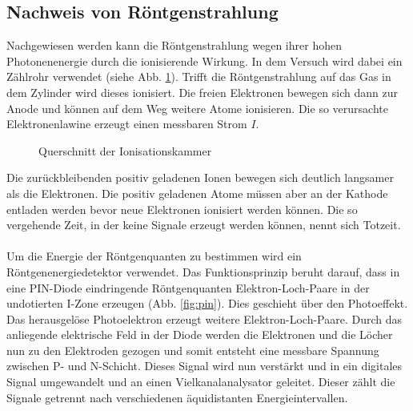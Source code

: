 \subsection{Nachweis von Röntgenstrahlung}

Nachgewiesen werden kann die Röntgenstrahlung wegen ihrer hohen Photonenenergie durch die ionisierende Wirkung. In dem Versuch wird dabei ein Zählrohr \cite{grundlagen} verwendet (siehe Abb. \ref{fig:rohr}). Trifft die Röntgenstrahlung auf das Gas in dem Zylinder wird dieses ionisiert. Die freien Elektronen bewegen sich dann zur Anode und können auf dem Weg weitere Atome ionisieren. Die so verursachte Elektronenlawine erzeugt einen messbaren Strom $I$. 

\begin{figure}[h]
  \centering
  \caption{Querschnitt der Ionisationskammer}
  \label{fig:rohr}
\end{figure}
Die zurückbleibenden positiv geladenen Ionen bewegen sich deutlich langsamer als die Elektronen. Die positiv geladenen Atome müssen aber an der Kathode entladen werden bevor neue Elektronen ionisiert werden können. Die so vergehende Zeit, in der keine Signale erzeugt werden können, nennt sich Totzeit. \\ \\
Um die Energie der Röntgenquanten zu bestimmen wird ein Röntgenenergiedetektor \cite{ld_detektor} verwendet. Das Funktionsprinzip beruht darauf, dass in eine PIN-Diode eindringende Röntgenquanten Elektron-Loch-Paare in der undotierten I-Zone erzeugen (Abb. \ref{fig:pin}). Dies geschieht über den Photoeffekt. Das herausgelöse Photoelektron erzeugt weitere Elektron-Loch-Paare. Durch das anliegende elektrische Feld in der Diode werden die Elektronen und die Löcher nun zu den Elektroden gezogen und somit entsteht eine messbare Spannung zwischen P- und N-Schicht. Dieses Signal wird nun verstärkt und in ein digitales Signal umgewandelt und an einen Vielkanalanalysator geleitet. Dieser zählt die Signale getrennt nach verschiedenen äquidistanten Energieintervallen.

